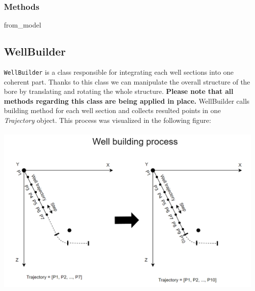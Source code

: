 \documentclass[english,10pt,a4paper]{article}
\begin{document}
\subsubsection{Methods}
\begin{description}
	\item[\colorbox{gray!20}{from\_model}] \hfill
\end{description}

	\newpage
	\subsection{WellBuilder}
	\texttt{WellBuilder} is a class responsible for integrating each well sections into one coherent part. Thanks to this class we can manipulate the overall structure of the bore by translating and rotating the whole structure. \textbf{Please note that all methods regarding this class are being applied in place.}
	WellBuilder calls building method for each well section and collects resulted points in one \textit{Trajectory} object. This process was visualized in the following figure:\\\\
	\includegraphics[width=\textwidth]{"images/well_builder/well_building_process.png"}\\
\end{document}
